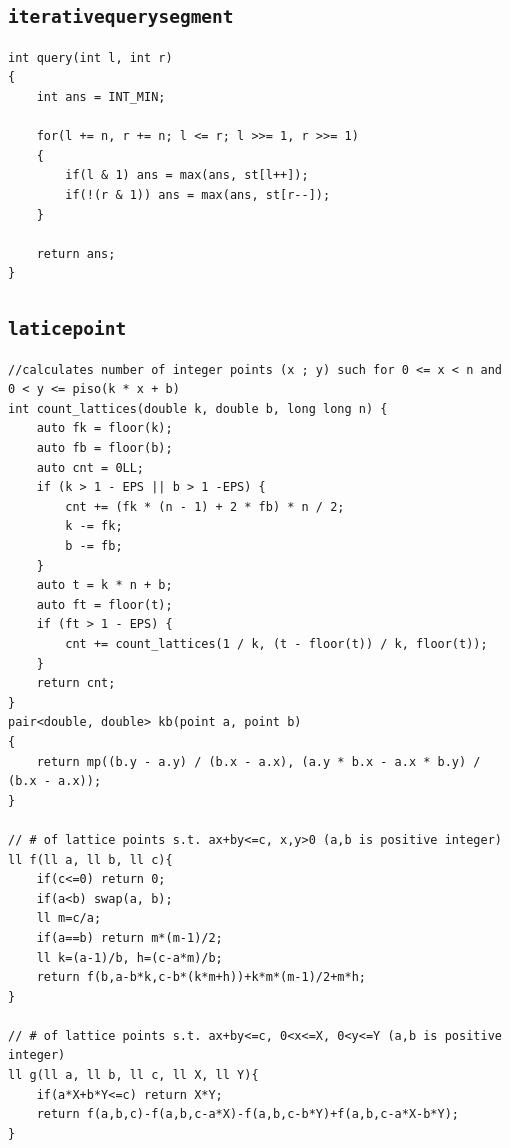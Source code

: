 \subsection{\texttt{iterativequerysegment}}
\begin{lstlisting}
int query(int l, int r)
{
    int ans = INT_MIN;

    for(l += n, r += n; l <= r; l >>= 1, r >>= 1)
    {
        if(l & 1) ans = max(ans, st[l++]);
        if(!(r & 1)) ans = max(ans, st[r--]);
    }

    return ans;
}\end{lstlisting}

\subsection{\texttt{laticepoint}}
\begin{lstlisting}
//calculates number of integer points (x ; y) such for 0 <= x < n and 0 < y <= piso(k * x + b)
int count_lattices(double k, double b, long long n) {
    auto fk = floor(k);
    auto fb = floor(b);
    auto cnt = 0LL;
    if (k > 1 - EPS || b > 1 -EPS) {
        cnt += (fk * (n - 1) + 2 * fb) * n / 2;
        k -= fk;
        b -= fb;
    }
    auto t = k * n + b;
    auto ft = floor(t);
    if (ft > 1 - EPS) {
        cnt += count_lattices(1 / k, (t - floor(t)) / k, floor(t));
    }
    return cnt;
}
pair<double, double> kb(point a, point b)
{
	return mp((b.y - a.y) / (b.x - a.x), (a.y * b.x - a.x * b.y) / (b.x - a.x));
}

// # of lattice points s.t. ax+by<=c, x,y>0 (a,b is positive integer)
ll f(ll a, ll b, ll c){
	if(c<=0) return 0;
	if(a<b) swap(a, b);
	ll m=c/a;
	if(a==b) return m*(m-1)/2;
	ll k=(a-1)/b, h=(c-a*m)/b;
	return f(b,a-b*k,c-b*(k*m+h))+k*m*(m-1)/2+m*h;
}
 
// # of lattice points s.t. ax+by<=c, 0<x<=X, 0<y<=Y (a,b is positive integer)
ll g(ll a, ll b, ll c, ll X, ll Y){
	if(a*X+b*Y<=c) return X*Y;
	return f(a,b,c)-f(a,b,c-a*X)-f(a,b,c-b*Y)+f(a,b,c-a*X-b*Y);
}\end{lstlisting}

